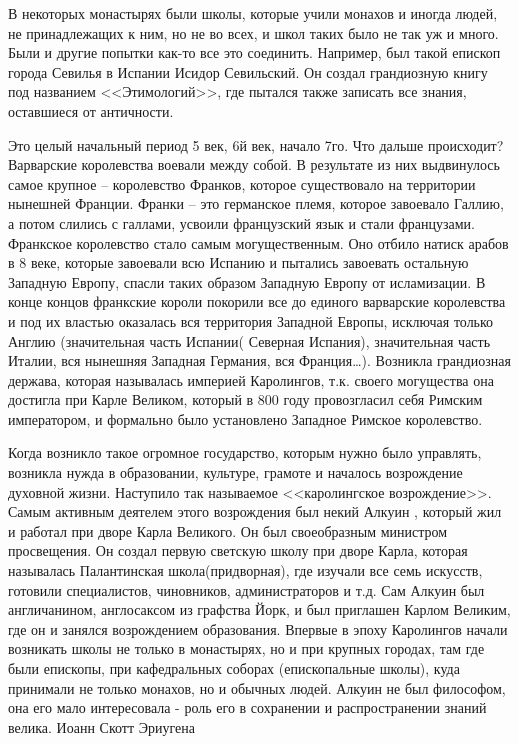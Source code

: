 В некоторых монастырях были школы, которые учили монахов и иногда людей, не принадлежащих к ним, но не во всех, и школ таких было не так уж и много. Были и другие попытки как-то все это соединить. Например, был такой епископ города Севилья в Испании Исидор Севильский. Он создал грандиозную книгу под названием <<Этимологий>>, где пытался также записать все знания, оставшиеся от античности.

Это целый начальный период 5 век, 6й век, начало 7го. Что дальше происходит? Варварские королевства воевали между собой. В результате из них выдвинулось самое крупное – королевство Франков, которое существовало на территории нынешней Франции. Франки – это германское племя, которое завоевало Галлию, а потом слились с галлами, усвоили французский язык и стали французами. Франкское королевство стало самым могущественным. Оно отбило натиск арабов в 8 веке, которые завоевали всю Испанию и пытались завоевать остальную Западную Европу, спасли таких образом Западную Европу от исламизации. В конце концов франкские короли покорили все до единого варварские королевства и под их властью оказалась вся территория Западной Европы, исключая только Англию (значительная часть Испании( Северная Испания), значительная часть Италии, вся нынешняя Западная Германия, вся Франция…). Возникла грандиозная держава, которая называлась империей Каролингов, т.к. своего могущества она достигла при Карле Великом, который в 800 году провозгласил себя Римским императором, и формально было установлено Западное Римское королевство.

Когда возникло такое огромное государство, которым нужно было управлять, возникла нужда в образовании, культуре, грамоте и началось возрождение духовной жизни. Наступило так называемое <<каролингское возрождение>>. Самым активным деятелем этого возрождения был некий Алкуин , который жил и работал при дворе Карла Великого. Он был своеобразным министром просвещения. Он создал первую светскую школу при дворе Карла, которая называлась Палантинская школа(придворная), где изучали все семь искусств, готовили специалистов, чиновников, администраторов и т.д. Сам Алкуин был англичанином, англосаксом из графства Йорк, и был приглашен Карлом Великим, где он и занялся возрождением образования. Впервые в эпоху Каролингов начали возникать школы не только в монастырях, но и при крупных городах, там где были епископы, при кафедральных соборах (епископальные школы), куда принимали не только монахов, но и обычных людей. Алкуин не был философом, она его мало интересовала - роль его в сохранении и распространении знаний велика.
Иоанн Скотт Эриугена

